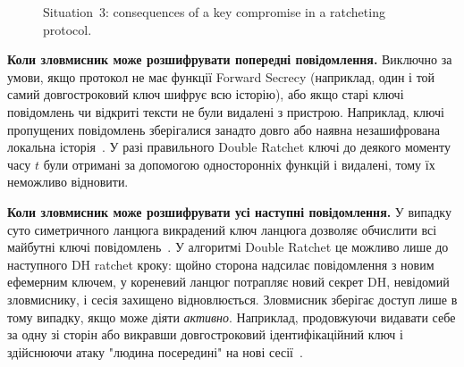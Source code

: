 \begin{figure}[H]
    \centering
    \caption{Situation~3: consequences of a key compromise in a ratcheting protocol.}
    \label{fig:s3}
\end{figure}

\textbf{Коли зловмисник може розшифрувати попередні повідомлення.} Виключно за умови, якщо протокол не має функції 
Forward Secrecy (наприклад, один і той самий довгостроковий ключ шифрує всю історію), або якщо старі ключі повідомлень 
чи відкриті тексти не були видалені з пристрою. Наприклад, ключі пропущених повідомлень зберігалися занадто довго 
або наявна незашифрована локальна історія~\cite{signal_double_ratchet}. У разі правильного Double Ratchet ключі 
до деякого моменту часу $t$ були отримані за допомогою односторонніх функцій і видалені, тому їх неможливо відновити.

\textbf{Коли зловмисник може розшифрувати усі наступні повідомлення.} У випадку суто симетричного ланцюга викрадений 
ключ ланцюга дозволяє обчислити всі майбутні ключі повідомлень~\cite{signal_double_ratchet}. У алгоритмі Double Ratchet 
це можливо лише до наступного DH ratchet кроку: щойно сторона надсилає повідомлення з новим ефемерним ключем, у 
кореневий ланцюг потрапляє новий секрет DH, невідомий зловмиснику, і сесія захищено відновлюється. Зловмисник 
зберігає доступ лише в тому випадку, якщо може діяти \emph{активно}. Наприклад, продовжуючи видавати себе за одну 
зі сторін або викравши довгостроковий ідентифікаційний ключ і здійснюючи атаку "людина посередині"{} на нові сесії~\cite{cohngordon2016pcs}.

